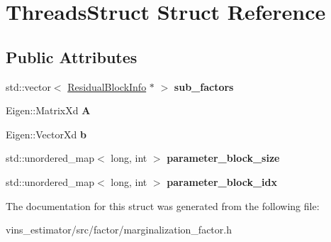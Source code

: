 \hypertarget{structThreadsStruct}{}\section{Threads\+Struct Struct Reference}
\label{structThreadsStruct}
\subsection*{Public Attributes}
\begin{DoxyCompactItemize}
\item 
\mbox{\label{structThreadsStruct_af30dbaf246cd88bc5f4b10184ff25c01}} 
std\+::vector$<$ \hyperlink{structResidualBlockInfo}{Residual\+Block\+Info} $\ast$ $>$ {\bfseries sub\+\_\+factors}
\item 
\mbox{\label{structThreadsStruct_a0f29e9dc3a39703d83068963f0989634}} 
Eigen\+::\+Matrix\+Xd {\bfseries A}
\item 
\mbox{\label{structThreadsStruct_a31af1d1f7ce234ccea97405b9706eb41}} 
Eigen\+::\+Vector\+Xd {\bfseries b}
\item 
\mbox{\label{structThreadsStruct_a5bf2d1baa608fdaf46ffa6aaaa6f0924}} 
std\+::unordered\+\_\+map$<$ long, int $>$ {\bfseries parameter\+\_\+block\+\_\+size}
\item 
\mbox{\label{structThreadsStruct_a33c2c3db86ad2a24bcd5a084e56ccc97}} 
std\+::unordered\+\_\+map$<$ long, int $>$ {\bfseries parameter\+\_\+block\+\_\+idx}
\end{DoxyCompactItemize}


The documentation for this struct was generated from the following file\+:\begin{DoxyCompactItemize}
\item 
vins\+\_\+estimator/src/factor/marginalization\+\_\+factor.\+h\end{DoxyCompactItemize}
